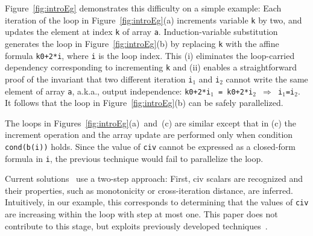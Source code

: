 \documentclass{sig-alternate}
\begin{document}


\enlargethispage{\baselineskip}

Figure~\ref{fig:introEg} demonstrates this difficulty on a
simple example:
%
Each iteration of the loop in Figure~\ref{fig:introEg}(a) increments 
variable {\tt k} by two, and updates the element at index {\tt k} of 
array {\tt a}. %
%
Induction-variable substitution generates the loop in Figure~\ref{fig:introEg}(b) 
by replacing {\tt k} with the affine formula {\tt k0+2*i}, where {\tt i} is the 
loop index.   This (i) eliminates the loop-carried dependency corresponding to 
incrementing {\tt k} and (ii) enables a straightforward proof of the invariant
that two different iteration {\tt i$_1$} and {\tt i$_2$} cannot write the same
element of array {\tt a}, a.k.a., output independence: 
{\tt k0+2*i$_1$~=~k0+2*i$_2$ $\Rightarrow$ i$_1$=i$_2$}.
It follows that the loop in Figure~\ref{fig:introEg}(b) can be safely parallelized.

The loops in Figures~\ref{fig:introEg}(a)~and~(c) are similar 
except that in (c) the increment operation and the 
array update are performed only when condition {\tt cond(b(i))} 
holds.  Since the value of {\tt civ} cannot be expressed %
as a closed-form formula in {\tt i}, the previous technique would
fail to parallelize the loop.%

Current solutions~\cite{Blume94RangeTest,SeqVars,PaduaStackArr,VEG,MonStmt,CohenBeyondMon} 
use a two-step approach:
First, {\sc civ} scalars are recognized and their properties, such as 
monotonicity or cross-iteration distance, are inferred.   
Intuitively, in our example, this corresponds to determining that 
the values of {\tt civ} are increasing %
within the loop with step at most one.
This paper does not contribute to this stage, but  
exploits previously developed techniques~\cite{VEG}.
\end{document}
